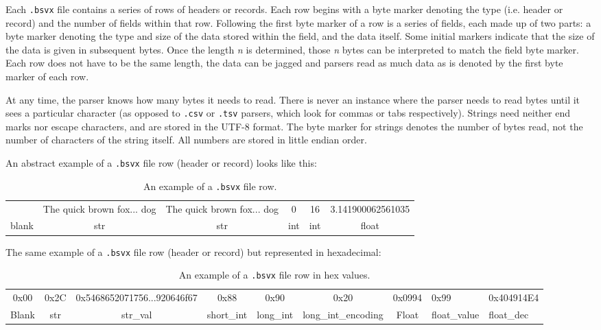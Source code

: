 \documentclass[10pt]{article}
\begin{document}
Each \texttt{.bsvx} file contains a series of rows of headers or records.
Each row begins with a byte marker denoting the type (i.e. header or record) and the number of fields within that row.
Following the first byte marker of a row is a series of fields, each made up of two parts: a byte marker denoting the type and size of the data stored within the field, and the data itself.
Some initial markers indicate that the size of the data is given in subsequent bytes.
Once the length \textit{n} is determined, those \textit{n} bytes can be interpreted to match the field byte marker.
Each row does not have to be the same length, the data can be jagged and parsers read as much data as is denoted by the first byte marker of each row. 

\indent{}
At any time, the parser knows how many bytes it needs to read.
There is never an instance where the parser needs to read bytes until it sees a particular character (as opposed to \texttt{.csv} or \texttt{.tsv} parsers, which look for commas or tabs respectively).
Strings need neither end marks nor escape characters, and are stored in the UTF-8 format.
The byte marker for strings denotes the number of bytes read, not the number of characters of the string itself.
All numbers are stored in little endian order.

\indent{}
An abstract example of a \texttt{.bsvx} file row (header or record) looks like this:

\begin{table}[H]
\centering
\begin{tabular}{|c|c|c|c|c|c|}
\hline
& The quick brown fox... dog & The quick brown fox... dog & 0 & 16 & 3.141900062561035 \\
blank & str & str & int & int & float \\ \hline
\end{tabular}
\caption{An example of a \texttt{.bsvx} file row.}
\label{tab:bsvxApproach_example}
\end{table}

\indent{}
The same example of a \texttt{.bsvx} file row (header or record) but represented in hexadecimal:

\begin{table}[H]
\centering
\begin{tabular}{|c|c|c|c|c|c|c|}
\hline
0x00 & 0x2C & 0x5468652071756...920646f67 & 0x88 & 0x90 & 0x20 & 0x0994 & 0x99 & 0x404914E4 \\
Blank & str &  str_val & short_int & long_int & long_int_encoding & Float & float_value & float_dec  \\ \hline
\end{tabular}
\caption{An example of a \texttt{.bsvx} file row in hex values.}
\label{tab:bsvxApproach_example in hexadecimal}
\end{table}
\end{document}
